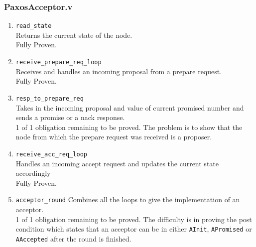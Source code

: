 \subsubsection{PaxosAcceptor.v}
\begin{enumerate}
  \item \texttt{read\_state} \\
    Returns the current state of the node. \\
    Fully Proven.
  \item \texttt{receive\_prepare\_req\_loop} \\
    Receives and handles an incoming proposal from
    a prepare request. \\
    Fully Proven.
  \item \texttt{resp\_to\_prepare\_req} \\
    Takes in the incoming proposal and value of current promised number
    and sends a promise or a nack response. \\
    1 of 1 obligation remaining to be proved. The problem is to show that
    the node from which the prepare request was received is a proposer.
  \item \texttt{receive\_acc\_req\_loop} \\
    Handles an incoming accept request and updates the current state accordingly \\
    Fully Proven.
  \item \texttt{acceptor\_round}
    Combines all the loops to give the implementation of an acceptor. \\
    1 of 1 obligation remaining to be proved. The difficulty is in proving
    the post condition which states that an acceptor can be in either \texttt{AInit},
    \texttt{APromised} or \texttt{AAccepted} after the round is finished.
\end{enumerate}

\vspace{-5mm}
